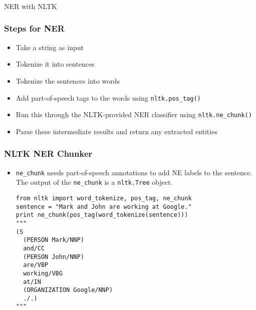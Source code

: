 \begin{frame}[fragile]\frametitle{}

\begin{center}
{\Large NER with NLTK}
\end{center}
\end{frame}

\begin{frame}[fragile]\frametitle{Steps for NER}
  \begin{itemize}
  \item Take a string as input
  \item Tokenize it into sentences
  \item Tokenize the sentences into words
  \item Add part-of-speech tags to the words using \lstinline|nltk.pos_tag()|
  \item  Run this through the NLTK-provided NER classifier using \lstinline|nltk.ne_chunk()|
  \item  Parse these intermediate results and return any extracted entities

  \end{itemize}
\end{frame}


\begin{frame}[fragile]\frametitle{NLTK NER Chunker}
  \begin{itemize}
  \item \lstinline|ne_chunk| needs part-of-speech annotations to add NE labels to the sentence. The output of the \lstinline|ne_chunk| is a \lstinline|nltk.Tree| object.
  \begin{lstlisting}
from nltk import word_tokenize, pos_tag, ne_chunk
sentence = "Mark and John are working at Google."
print ne_chunk(pos_tag(word_tokenize(sentence)))
"""
(S
  (PERSON Mark/NNP)
  and/CC
  (PERSON John/NNP)
  are/VBP
  working/VBG
  at/IN
  (ORGANIZATION Google/NNP)
  ./.)
"""
  \end{lstlisting}
  \end{itemize}
\end{frame}


